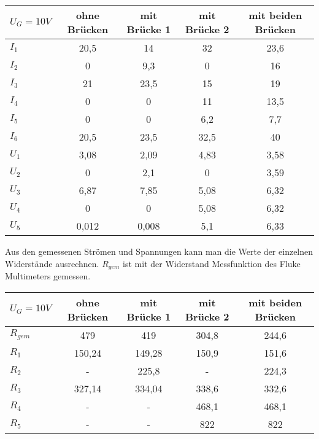 \documentclass[
a4paper,     %
 headsepline, %
11pt         %
]{scrartcl}  %
\begin{document}
\begin{center}
  \begin{tabular}{ l | c | c | c | c }
    \hline
    $U_G=10V$   & ohne Brücken & mit Brücke 1 & mit Brücke 2 & mit beiden Brücken \\ \hline
    $I_1$ & 20,5 & 14   & 32   & 23,6 \\ \hline
    $I_2$ & 0    & 9,3  & 0    & 16   \\ \hline
    $I_3$ & 21   & 23,5 & 15   & 19   \\ \hline
    $I_4$ & 0    & 0    & 11   & 13,5 \\ \hline
    $I_5$ & 0    & 0    & 6,2  & 7,7  \\ \hline
    $I_6$ & 20,5 & 23,5 & 32,5 & 40   \\ \hline
    $U_1$ & 3,08 & 2,09 & 4,83 & 3,58 \\ \hline
    $U_2$ & 0    & 2,1  & 0    & 3,59 \\ \hline
    $U_3$ & 6,87 & 7,85 & 5,08 & 6,32 \\ \hline
    $U_4$ & 0    & 0    & 5,08 & 6,32 \\ \hline
    $U_5$ & 0,012 & 0,008 & 5,1 & 6,33 \\ \hline
    \hline
  \end{tabular}
\end{center}

Aus den gemessenen Strömen und Spannungen kann man die Werte der einzelnen Widerstände ausrechnen.
$R_{gem}$ ist mit der Widerstand Messfunktion des Fluke Multimeters gemessen.

\begin{center}
  \begin{tabular}{ l | c | c | c | c }
    \hline
    $U_G=10V$   & ohne Brücken & mit Brücke 1 & mit Brücke 2 & mit beiden Brücken \\ \hline
    $R_{gem}$ & 479    & 419    & 304,8 & 244,6 \\ \hline
    $R_{1}$   & 150,24 & 149,28 & 150,9 & 151,6 \\ \hline
    $R_{2}$   & -      & 225,8  & -     & 224,3 \\ \hline
    $R_{3}$   & 327,14 & 334,04 & 338,6 & 332,6 \\ \hline
    $R_{4}$   & -      & -      & 468,1 & 468,1 \\ \hline
    $R_{5}$   & -      & -      & 822   & 822   \\ \hline
    \hline
  \end{tabular}
\end{center}
\end{document}
